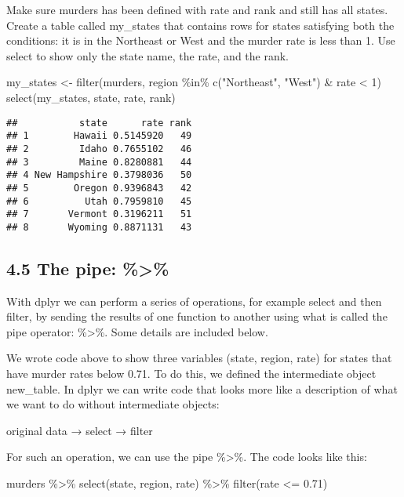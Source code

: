 \documentclass[
]{article}
\newenvironment{Shaded}{\begin{snugshade}}{\end{snugshade}}
\newcommand{\DecValTok}[1]{\textcolor[rgb]{0.00,0.00,0.81}{#1}}
\newcommand{\FloatTok}[1]{\textcolor[rgb]{0.00,0.00,0.81}{#1}}
\newcommand{\FunctionTok}[1]{\textcolor[rgb]{0.00,0.00,0.00}{#1}}
\newcommand{\NormalTok}[1]{#1}
\newcommand{\OtherTok}[1]{\textcolor[rgb]{0.56,0.35,0.01}{#1}}
\newcommand{\SpecialCharTok}[1]{\textcolor[rgb]{0.00,0.00,0.00}{#1}}
\newcommand{\StringTok}[1]{\textcolor[rgb]{0.31,0.60,0.02}{#1}}
\begin{document}
Make sure murders has been defined with rate and rank and still has all
states. Create a table called my\_states that contains rows for states
satisfying both the conditions: it is in the Northeast or West and the
murder rate is less than 1. Use select to show only the state name, the
rate, and the rank.

\begin{Shaded}
\begin{Highlighting}[]
\NormalTok{my\_states }\OtherTok{\textless{}{-}} \FunctionTok{filter}\NormalTok{(murders, region }\SpecialCharTok{\%in\%} \FunctionTok{c}\NormalTok{(}\StringTok{"Northeast"}\NormalTok{, }\StringTok{"West"}\NormalTok{) }\SpecialCharTok{\&}\NormalTok{ rate }\SpecialCharTok{\textless{}} \DecValTok{1}\NormalTok{)}
\FunctionTok{select}\NormalTok{(my\_states, state, rate, rank)}
\end{Highlighting}
\end{Shaded}

\begin{verbatim}
##           state      rate rank
## 1        Hawaii 0.5145920   49
## 2         Idaho 0.7655102   46
## 3         Maine 0.8280881   44
## 4 New Hampshire 0.3798036   50
## 5        Oregon 0.9396843   42
## 6          Utah 0.7959810   45
## 7       Vermont 0.3196211   51
## 8       Wyoming 0.8871131   43
\end{verbatim}

\hypertarget{the-pipe}{%
\subsection{4.5 The pipe: \%\textgreater\%}\label{the-pipe}}

With dplyr we can perform a series of operations, for example select and
then filter, by sending the results of one function to another using
what is called the pipe operator: \%\textgreater\%. Some details are
included below.

We wrote code above to show three variables (state, region, rate) for
states that have murder rates below 0.71. To do this, we defined the
intermediate object new\_table. In dplyr we can write code that looks
more like a description of what we want to do without intermediate
objects:

original data → select → filter

For such an operation, we can use the pipe \%\textgreater\%. The code
looks like this:

\begin{Shaded}
\begin{Highlighting}[]
\NormalTok{murders }\SpecialCharTok{\%\textgreater{}\%} \FunctionTok{select}\NormalTok{(state, region, rate) }\SpecialCharTok{\%\textgreater{}\%} \FunctionTok{filter}\NormalTok{(rate }\SpecialCharTok{\textless{}=} \FloatTok{0.71}\NormalTok{)}
\end{Highlighting}
\end{Shaded}
\end{document}

